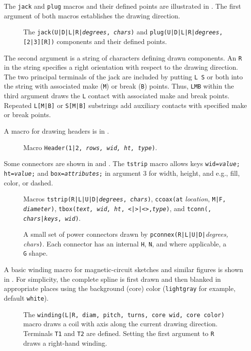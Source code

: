 The {\tt jack} and {\tt plug} macros and their defined points are
illustrated in .
The first argument of both macros establishes the drawing direction.
\begin{figure}[H]
   
   \vspace{-1ex}
   \caption{The {\tt jack(U|D|L|R|{\sl degrees}, {\sl chars})}
    and {\tt plug(U|D|L|R|{\sl degrees},[2|3][R])} components
    and their defined points.}
   \label{Jack}
   \end{figure}
\noindent%
\enlargethispage{\baselineskip}
 The second argument is a string of characters defining drawn components.
 An {\tt R} in the string specifies a
 right orientation with respect to the drawing direction.
 The two principal terminals of
 the jack are included by putting \hbox{{\tt L} {\tt S}}
 or both into the string with associated make ({\tt M})
 or break ({\tt B}) points.  Thus, {\tt LMB} within the third
 argument draws the {\tt L} contact with
 associated make and break points. Repeated {\tt L[M|B]}
 or {\tt S[M|B]} substrings add auxiliary contacts with 
 specified make or break points.


A macro for drawing headers is in .
\begin{figure}[H]
   
   \caption{Macro {\tt Header(1|2, {\sl rows, wid, ht, type})}.}
   \label{Headers}
   \end{figure}

Some connectors are shown in  and .
The {\tt tstrip} macro allows keys
 {\tt wid={\sl{}value};}
 {\tt ht={\sl{}value};} and
 {\tt box={\sl{}attributes};}
 in argument 3 for width, height, and e.g., fill, color, or dashed.
\begin{figure}[H]
   
   \caption{Macros {\tt tstrip(R|L|U|D|{\sl degrees}, {\sl chars})},
     {\tt ccoax(at} {\sl location}, {\tt M|F, {\sl diameter})},
     {\tt tbox({\sl text, wid, ht}, <|>|<>,{\sl type})}, and
     {\tt tconn(\linespec, {\sl chars}|{\sl keys}, {\sl wid})}. }
   \label{Conn}
   \end{figure}
\begin{figure}[H]
   
   \caption{A small set of power connectors drawn by
    {\tt pconnex(R|L|U|D|}{\sl degrees, chars}{\tt)}. Each connector has
    an internal {\tt H}, {\tt N}, and where applicable, a {\tt G} shape.}
   \label{Pconn}
   \end{figure}

A basic winding macro for magnetic-circuit sketches and similar figures
is shown in .
For simplicity, the complete spline
is first drawn and then blanked in appropriate places using the background
(core) color (\verb!lightgray! for example, default \verb!white!).
\begin{figure}[H]
   
   \caption{The {\tt winding(L|R, diam, pitch, turns, core wid, core color)}
     macro draws a coil with axis along the current drawing direction.
     Terminals {\tt T1} and {\tt T2} are defined.
     Setting the first argument to {\tt R} draws a right-hand winding.}
   \label{Windings}
   \end{figure}


